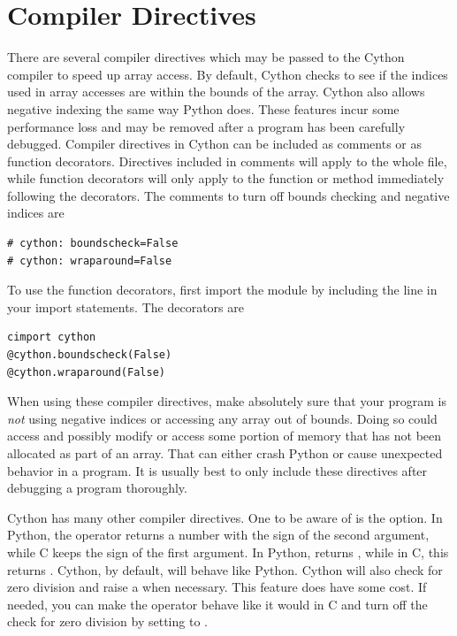 \section*{Compiler Directives}
There are several compiler directives which may be passed to the Cython compiler to speed up array access.
By default, Cython checks to see if the indices used in array accesses are within the bounds of the array.
Cython also allows negative indexing the same way Python does.
These features incur some performance loss and may be removed after a program has been carefully debugged.
Compiler directives in Cython can be included as comments or as function decorators.
Directives included in comments will apply to the whole file, while function decorators will only apply to the function or method immediately following the decorators.
The comments to turn off bounds checking and negative indices are
\begin{lstlisting}
# cython: boundscheck=False
# cython: wraparound=False
\end{lstlisting}
To use the function decorators, first import the  module by including the line  in your import statements.
The decorators are
\begin{lstlisting}
cimport cython
@cython.boundscheck(False)
@cython.wraparound(False)
\end{lstlisting}
When using these compiler directives, make absolutely sure that your program is \emph{not} using negative indices or accessing any array out of bounds.
Doing so could access and possibly modify or access some portion of memory that has not been allocated as part of an array.
That can either crash Python or cause unexpected behavior in a program.
It is usually best to only include these directives after debugging a program thoroughly.

Cython has many other compiler directives.
One to be aware of is the  option.
In Python, the \li{\%} operator returns a number with the sign of the second argument, while C keeps the sign of the first argument.
In Python,  returns , while in C, this returns .
Cython, by default, will behave like Python.
Cython will also check for zero division and raise a  when necessary.
This feature does have some cost.
If needed, you can make the \li{\%} operator behave like it would in C and turn off the check for zero division by setting  to .

